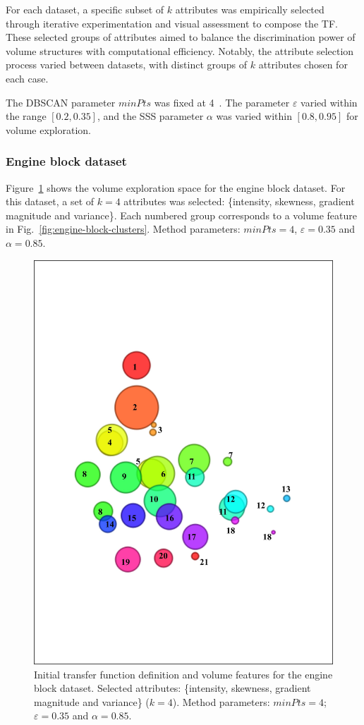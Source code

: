 For each dataset, a specific subset of \(k\) attributes was empirically selected through iterative experimentation and visual assessment to compose the TF. These selected groups of attributes aimed to balance the discrimination power of volume structures with computational efficiency. Notably, the attribute selection process varied between datasets, with distinct groups of \(k\) attributes chosen for each case.

The DBSCAN parameter $minPts$ was fixed at 4~\cite{ester1996}. The parameter $\varepsilon$ varied within the range $[0.2, 0.35]$, and the SSS parameter $\alpha$ was varied within $[0.8, 0.95]$ for volume exploration.


\subsubsection{Engine block dataset}
\label{subsubsec:engine-block}

Figure~\ref{fig:engine-block-clusters-tf} shows the volume exploration space for the engine block dataset. For this dataset, a set of \(k = 4\) attributes was selected: \{intensity, skewness, gradient magnitude and variance\}. Each numbered group corresponds to a volume feature in Fig.~\ref{fig:engine-block-clusters}. Method parameters: $minPts=4$, $\varepsilon=0.35$ and $\alpha=0.85$.

\begin{figure}[htb!]
    \centering
    \includegraphics[width=0.6\columnwidth]{figs/engine-block-clusters-tf.jpg}
    \caption{Initial transfer function definition and volume features for the engine block dataset. Selected attributes: \{intensity, skewness, gradient magnitude and variance\} (\(k=4\)). Method parameters: $minPts=4$; $\varepsilon=0.35$ and $\alpha=0.85$.}
    \label{fig:engine-block-clusters-tf}
\end{figure}

